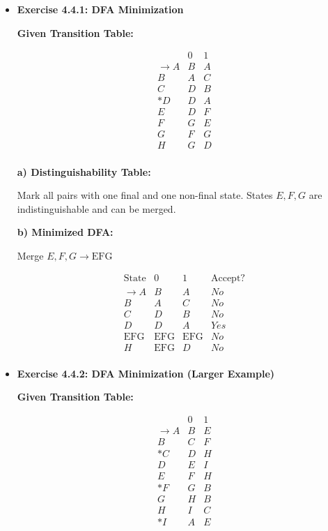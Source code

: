 \documentclass[11pt]{article}
\begin{document}
\begin{itemize}[leftmargin=*]
\vspace{1em}

\item \textbf{Exercise 4.4.1: DFA Minimization}

\textbf{Given Transition Table:}

\[
\begin{array}{c|cc}
    & 0 & 1 \\
    \hline
    \rightarrow A & B & A \\
    B & A & C \\
    C & D & B \\
    *D & D & A \\
    E & D & F \\
    F & G & E \\
    G & F & G \\
    H & G & D \\
\end{array}
\]

\textbf{a) Distinguishability Table:}

Mark all pairs with one final and one non-final state. States \( E, F, G \) are indistinguishable and can be merged.

\textbf{b) Minimized DFA:}

Merge \( E, F, G \to \text{EFG} \)

\[
\begin{array}{c|cc|c}
    \text{State} & 0 & 1 & \text{Accept?} \\
    \hline
    \rightarrow A & B & A & No \\
    B & A & C & No \\
    C & D & B & No \\
    D & D & A & Yes \\
    \text{EFG} & \text{EFG} & \text{EFG} & No \\
    H & \text{EFG} & D & No \\
\end{array}
\]

\vspace{1em}

\item \textbf{Exercise 4.4.2: DFA Minimization (Larger Example)}

\textbf{Given Transition Table:}

\[
\begin{array}{c|cc}
    & 0 & 1 \\
    \hline
    \rightarrow A & B & E \\
    B & C & F \\
    *C & D & H \\
    D & E & I \\
    E & F & H \\
    *F & G & B \\
    G & H & B \\
    H & I & C \\
    *I & A & E \\
\end{array}
\]


\end{itemize}
\end{document}
